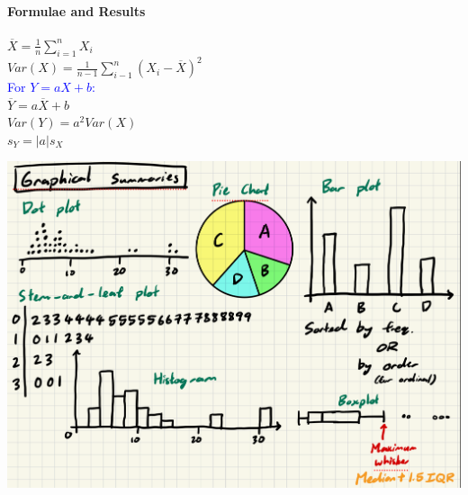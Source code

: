 \paragraph{Formulae and Results}
$\overline{X}=\frac{1}{n}\sum_{i=1}^nX_i$\\
$Var(X)=\frac{1}{n-1}\sum_{i-1}^n(X_i-\overline{X})^2$\\
\textcolor{Blue}{For $Y=aX+b$:}\\
$\overline{Y}=a\overline{X}+b$\\
$Var(Y)=a^2Var(X)$\\
$s_Y=\left|a\right|s_X$
\begin{Figure}
	\includegraphics[width=\linewidth]{graphicalSummaries.png}
\end{Figure}
